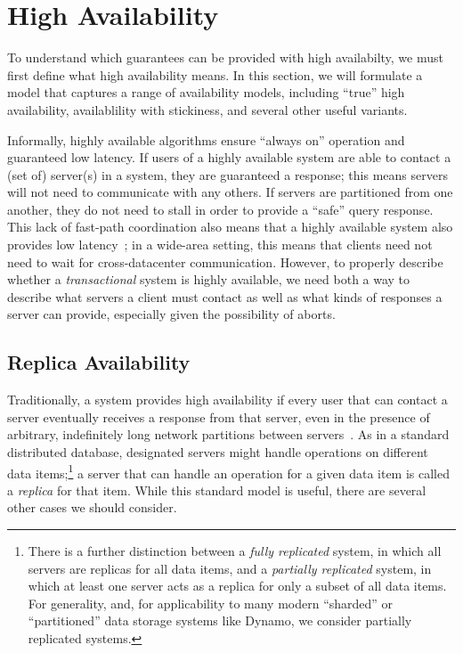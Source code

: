 
\section{High Availability}
\label{sec:availability}

To understand which guarantees can be provided with high availabilty,
we must first define what high availability means. In this section, we
will formulate a model that captures a range of availability models,
including ``true'' high availability, availablility with stickiness,
and several other useful variants.

Informally, highly available algorithms ensure ``always on'' operation
and guaranteed low latency. If users of a highly available system are
able to contact a (set of) server(s) in a system, they are guaranteed
a response; this means servers will not need to communicate with any
others. If servers are partitioned from one another, they do not need
to stall in order to provide a ``safe'' query response. This lack of
fast-path coordination also means that a highly available system also
provides low latency~\cite{abadi-pacelc}; in a wide-area setting, this
means that clients need not need to wait for cross-datacenter
communication. However, to properly describe whether a
\textit{transactional} system is highly available, we need both a way
to describe what servers a client must contact as well as what kinds
of responses a server can provide, especially given the possibility of
aborts.

\subsection{Replica Availability}

Traditionally, a system provides high availability if every user that
can contact a server eventually receives a response from that server,
even in the presence of arbitrary, indefinitely long network
partitions between servers~\cite{gilbert-cap}. As in a standard
distributed database, designated servers might handle operations on
different data items;\footnote{There is a further distinction between
  a \textit{fully replicated} system, in which all servers are
  replicas for all data items, and a \textit{partially replicated}
  system, in which at least one server acts as a replica for only a
  subset of all data items. For generality, and, for applicability to
  many modern ``sharded'' or ``partitioned'' data storage systems like
  Dynamo, we consider partially replicated systems.} a server that can
handle an operation for a given data item is called a \textit{replica}
for that item. While this standard model is useful, there are several
other cases we should consider.

